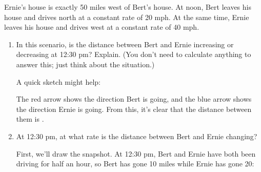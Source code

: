 \documentclass{article}
\begin{document}
\begin{enumerate}
Ernie's house is exactly 50 miles west of Bert's house.  At noon, Bert
  leaves his house and drives north at a constant rate of 20 mph.  At the
  same time, Ernie leaves his house and drives west at a constant rate of
  40 mph.
  \begin{enumerate}
  \item
    \begin{problem}[\nstretch{1}]
      In this scenario, is the distance between Bert and Ernie increasing
      or decreasing at 12:30 pm?  Explain.  (You don't need to calculate
      anything to answer this; just think about the situation.)
    \end{problem}

    \begin{solution}
      A quick sketch might help:
      \begin{center}
      \end{center}
      The red arrow shows the direction Bert is going, and the blue arrow
      shows the direction Ernie is going.  From this, it's clear that the
      distance between them is . 
    \end{solution}

  \item
\begin{problem}[\stretch{2}]
      At 12:30 pm, at what rate is the distance between Bert and Ernie
      changing?      
    \end{problem}

    \begin{solution} 

      First, we'll draw the snapshot.  At 12:30 pm, Bert and Ernie have
      both been driving for half an hour, so Bert has gone 10 miles while
      Ernie has gone 20:
      \begin{center}


\end{center}
\end{solution}
\end{enumerate}
\end{enumerate}
\end{document}
